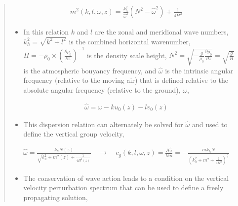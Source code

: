 \documentclass[letterpaper,10pt,english]{sphinxmanual}
\begin{document}
\begin{itemize}
\begin{quote}
\begin{itemize}
\end{itemize}
\begin{equation*}
\begin{split}m^2 \left( k, l, \omega, z \right) = \frac{k_h^2}{\hat{\omega}^2} \left( N^2 - \hat{\omega}^2 \right) + \frac{1}{4H^2}\end{split}
\end{equation*}\begin{itemize}
\item {} 
In this relation \(k\) and \(l\) are the zonal and meridional wave numbers, \(k_h^2 = \sqrt{k^2 + l^2}\) is the combined horizontal wavenumber, \(H = - \rho_0 \times \left( \frac{\partial \rho_0}{\partial z} \right)^{-1}\) is the density scale height, \(N^2 = \sqrt{-\frac{g}{\rho_0} \frac{\partial \rho_0}{\partial z}} = \sqrt{\frac{g}{H}}\) is the atmospheric bouyancy frequency, and \(\hat{\omega}\) is the intrinsic angular frequency (relative to the moving air) that is defined relative to the absolute angular frequency (relative to the ground), \(\omega\),

\end{itemize}
\begin{equation*}
\begin{split}\hat{\omega} = \omega - k u_0 \left( z \right) - l v_0 \left( z \right)\end{split}
\end{equation*}\begin{itemize}
\item {} 
This dispersion relation can alternately be solved for \(\hat{\omega}\) and used to define the vertical group velocity,

\end{itemize}
\begin{equation*}
\begin{split}\hat{\omega} = \frac{k_h N \left( z \right)}{\sqrt{ k_h^2 + m^2 \left( z \right) + \frac{1}{4 H^2 \left( z \right)}}} \quad \rightarrow \quad
c_g \left(k, l, \omega, z \right) = \frac{\partial \hat{\omega}}{\partial m} = -\frac{m k_h N}{\left( k_h^2 + m^2 + \frac{1}{4 H^2} \right)^\frac{3}{2}}\end{split}
\end{equation*}\begin{itemize}
\item {} 
The conservation of wave action leads to a condition on the vertical velocity perturbation spectrum that can be used to define a freely propagating solution,


\end{itemize}
\end{quote}
\end{itemize}
\end{document}

